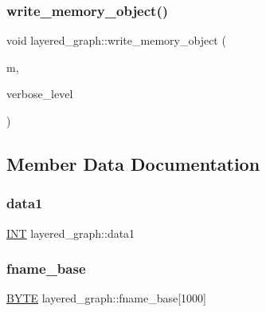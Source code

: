 \subsubsection{\texorpdfstring{write\+\_\+memory\+\_\+object()}{write\_memory\_object()}}
{\footnotesize\ttfamily void layered\+\_\+graph\+::write\+\_\+memory\+\_\+object (\begin{DoxyParamCaption}\item[{\mbox{\hyperlink{classmemory__object}{memory\+\_\+object}} $\ast$}]{m,  }\item[{\mbox{\hyperlink{galois_8h_a09fddde158a3a20bd2dcadb609de11dc}{I\+NT}}}]{verbose\+\_\+level }\end{DoxyParamCaption})}



\subsection{Member Data Documentation}
\mbox{\label{classlayered__graph_a4d306549afff70ae54e9acb93fedec82}} 
\subsubsection{\texorpdfstring{data1}{data1}}
{\footnotesize\ttfamily \mbox{\hyperlink{galois_8h_a09fddde158a3a20bd2dcadb609de11dc}{I\+NT}} layered\+\_\+graph\+::data1}

\mbox{\label{classlayered__graph_a4f2e41c956d3605418eb0f5975917c1c}} 
\subsubsection{\texorpdfstring{fname\+\_\+base}{fname\_base}}
{\footnotesize\ttfamily \mbox{\hyperlink{galois_8h_ab6cc7b4aeb6ea31aba2b3fbfc83ff5e6}{B\+Y\+TE}} layered\+\_\+graph\+::fname\+\_\+base\mbox{[}1000\mbox{]}}

\mbox{\label{classlayered__graph_aa738bb882e2c4b35ead77eb4777f58ee}} 
